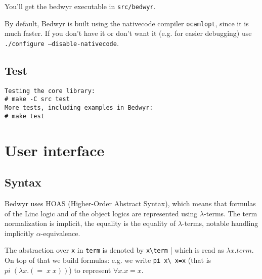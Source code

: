 \documentclass{article}
\begin{document}
You'll get the bedwyr executable in \texttt{src/bedwyr}.

By default, Bedwyr is built using the nativecode compiler \texttt{ocamlopt},
since it is much faster. If you don't have it or don't want it (e.g.
for easier debugging) use \texttt{./configure --disable-nativecode}.

\subsection{Test}

\begin{verbatim}
Testing the core library:
# make -C src test
More tests, including examples in Bedwyr:
# make test
\end{verbatim}

\newpage
\section{User interface}
\label{sec:interface}

\subsection{Syntax}

Bedwyr uses HOAS (Higher-Order Abstract Syntax), which means that formulas
of the Linc logic and of the object logics are represented using 
$\lambda$-terms. The term normalization is implicit, the equality is the 
equality of $\lambda$-terms, notable handling implicitly $\alpha$-equivalence.

The abstraction over \verb.x. in \verb.term. is denoted by \verb.x\term. | 
which is read as $\lambda x. term$. On top of that we build 
formulas: e.g. we write \verb.pi x\ x=x.
(that is $pi\;(\lambda{}x.(=\;x\;x))$)
to represent $\forall x. x=x$.
\end{document}
